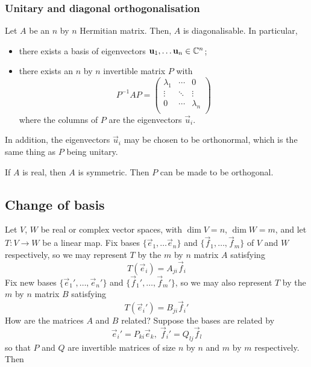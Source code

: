 \documentclass{../../template/note}
\begin{document}
    \subsubsection{Unitary and diagonal orthogonalisation}

    \begin{theorem}
        Let \(A\) be an \(n\) by \(n\) Hermitian matrix. Then, \(A\) is diagonalisable. In particular,
        \begin{itemize}
            \item there exists a basis of eigenvectors \(\vec u_1, \dots \vec u_n \in \CC^n\);
            \item there exists an \(n\) by \(n\) invertible matrix \(P\) with
            \[
                P^{-1}AP = \begin{pmatrix}
                 \lambda_1 & \cdots & 0 \\
                 \vdots & \ddots & \vdots \\
                 0 & \cdots & \lambda_n \\
                \end{pmatrix}
            \]
            where the columns of \(P\) are the eigenvectors \(\vec u_i\).
        \end{itemize}
    \end{theorem}
    
    \begin{remark*}
        In addition, the eigenvectors \(\vec u_i\) may be chosen to be orthonormal, which is the same thing as \(P\) being unitary.
    \end{remark*}
    
    \begin{remark*}
        If \(A\) is real, then \(A\) is symmetric. Then \(P\) can be made to be orthogonal.
    \end{remark*}
    
    \subsection{Change of basis}

    Let \(V\), \(W\) be real or complex vector spaces, with \(\dim V = n\), \(\dim W = m\), and let \(T: V \to W\) be a linear map. Fix bases \(\{\vec e_1, \dots \vec e_n\}\) and \(\{\vec f_1, \dots, \vec f_m\}\) of \(V\) and \(W\) respectively, so we may represent \(T\) by the \(m\) by \(n\) matrix \(A\) satisfying
    \[
        T(\vec e_i) = A_{ji} \vec f_i
    \]
    Fix new bases \(\{\vec e_1', \dots, \vec e_n'\}\) and \(\{\vec f_1', \dots, \vec f_m'\}\), so we may also represent \(T\) by the \(m\) by \(n\) matrix \(B\) satisfying
    \[
        T(\vec e_i') = B_{ji} \vec f_i'
    \]
    How are the matrices \(A\) and \(B\) related? Suppose the bases are related by
    \[
        \vec e_i' = P_{ki}\vec e_k, \; \vec f_i' = Q_{lj} \vec f_l
    \]
    so that \(P\) and \(Q\) are invertible matrices of size \(n\) by \(n\) and \(m\) by \(m\) respectively. Then
\end{document}
